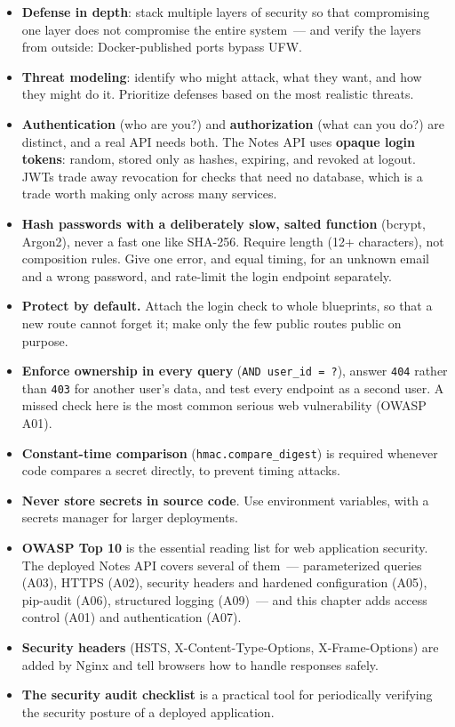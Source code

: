 \label{38-security:key-takeaways}
\begin{takeaways}

\begin{itemize}
\tightlist
\item
  \textbf{Defense in depth}: stack multiple layers of security so that compromising one layer does not compromise the entire system~--- and verify the layers from outside: Docker-published ports bypass UFW.
\item
  \textbf{Threat modeling}: identify who might attack, what they want, and how they might do it. Prioritize defenses based on the most realistic threats.
\item
  \textbf{Authentication} (who are you?) and \textbf{authorization} (what can you do?) are distinct, and a real API needs both. The Notes API uses \textbf{opaque login tokens}: random, stored only as hashes, expiring, and revoked at logout. JWTs trade away revocation for checks that need no database, which is a trade worth making only across many services.
\item
  \textbf{Hash passwords with a deliberately slow, salted function} (bcrypt, Argon2), never a fast one like SHA-256. Require length (12+ characters), not composition rules. Give one error, and equal timing, for an unknown email and a wrong password, and rate-limit the login endpoint separately.
\item
  \textbf{Protect by default.} Attach the login check to whole blueprints, so that a new route cannot forget it; make only the few public routes public on purpose.
\item
  \textbf{Enforce ownership in every query} (\texttt{AND\ user\_id\ =\ ?}), answer \texttt{404} rather than \texttt{403} for another user's data, and test every endpoint as a second user. A missed check here is the most common serious web vulnerability (OWASP A01).
\item
  \textbf{Constant-time comparison} (\texttt{hmac.compare\_digest}) is required whenever code compares a secret directly, to prevent timing attacks.
\item
  \textbf{Never store secrets in source code}. Use environment variables, with a secrets manager for larger deployments.
\item
  \textbf{OWASP Top 10} is the essential reading list for web application security. The deployed Notes API covers several of them~--- parameterized queries (A03), HTTPS (A02), security headers and hardened configuration (A05), pip-audit (A06), structured logging (A09)~--- and this chapter adds access control (A01) and authentication (A07).
\item
  \textbf{Security headers} (HSTS, X-Content-Type-Options, X-Frame-Options) are added by Nginx and tell browsers how to handle responses safely.
\item
  \textbf{The security audit checklist} is a practical tool for periodically verifying the security posture of a deployed application.
\end{itemize}

\end{takeaways}

